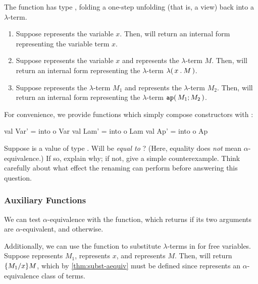 \documentclass[11pt]{article}
\begin{document}
The function  has type , folding a one-step unfolding (that is, a view) back into a $\lambda$-term.

\begin{enumerate}
  \item
    Suppose  represents the variable $x$.
    Then,  will return an internal form representing the variable term $x$.

  \item
    Suppose  represents the variable $x$ and  represents the $\lambda$-term $M$.
    Then,  will return an internal form representing the $\lambda$-term ${\lambda}\mathtt{(}\,{x}\mathbin{\mathtt{.}}{M}\,\mathtt{)}$.

  \item
    Suppose  represents the $\lambda$-term $M_1$ and  represents the $\lambda$-term $M_2$.
    Then,  will return an internal form representing the $\lambda$-term ${\mathtt{ap}}\mathtt{(}\,M_1;M_2\,\mathtt{)}$.
\end{enumerate}

For convenience, we provide functions which simply compose constructors with :
\begin{codeblock}
  val Var' = into o Var
  val Lam' = into o Lam
  val Ap' = into o Ap
\end{codeblock}

\begin{task}{5}
  Suppose  is a value of type .
  Will  be \emph{equal to} ?
  (Here, equality does \emph{not} mean $\alpha$-equivalence.)
  If so, explain why; if not, give a simple counterexample.
  Think carefully about what effect the renaming  can perform before answering this question.
\end{task}

\subsubsection{Auxiliary Functions}

We can test $\alpha$-equivalence with the  function, which returns  if its two arguments are $\alpha$-equivalent, and
 otherwise.

Additionally, we can use the  function to substitute $\lambda$-terms in for free variables.
Suppose  represents $M_1$,  represents $x$, and  represents $M$.
Then,  will return $\{{M_1}\mathord{/}{x}\}{M}$, which by \cref{thm:subst-aequiv} must be defined since  represents an $\alpha$-equivalence class of terms.
\end{document}
